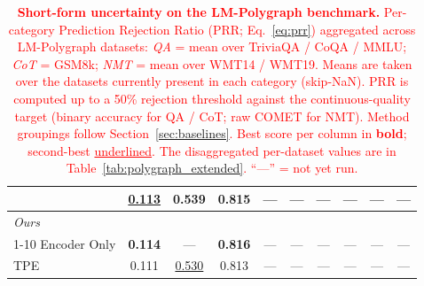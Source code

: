 \begin{table}[!t]
{\begin{tabular}{l *{3}{c} *{3}{c} *{3}{c}}
                                 & \underline{0.113} & \textbf{0.539} & 0.815 & --- & --- & --- & --- & --- & --- \\
\midrule
\multicolumn{10}{l}{\textit{Ours}} \\
\cmidrule(l){1-10}
Encoder Only                     & \textbf{0.114} & ---   & \textbf{0.816} & --- & --- & --- & --- & --- & --- \\
TPE                         & 0.111 & \underline{0.530} & 0.813 & --- & --- & --- & --- & --- & --- \\
\bottomrule
\end{tabular}%
}
\caption{\textcolor{red}{\textbf{Short-form uncertainty on the LM-Polygraph benchmark.}
Per-category Prediction Rejection Ratio (PRR; Eq.~\ref{eq:prr}) aggregated
across LM-Polygraph datasets: \emph{QA} = mean over TriviaQA / CoQA / MMLU;
\emph{CoT} = GSM8k; \emph{NMT} = mean over WMT14 / WMT19. Means are taken
over the datasets currently present in each category (skip-NaN). PRR is
computed up to a 50\% rejection threshold against the continuous-quality
target (binary accuracy for QA / CoT; raw COMET for NMT). Method groupings
follow Section~\ref{sec:baselines}. Best score per column in \textbf{bold};
second-best \underline{underlined}. The disaggregated per-dataset values are
in Table~\ref{tab:polygraph_extended}. ``---'' = not yet run.}}
\label{tab:polygraph}
\end{table}
